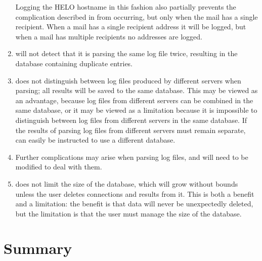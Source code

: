 \begin{enumerate}
        Logging the HELO hostname in this fashion also partially prevents
        the complication described in  from occurring, but only when the mail has a
        single recipient.  When a mail has a single recipient address it
        will be logged, but when a mail has multiple recipients no
        addresses are logged.

    \item \parsername{} will not detect that it is parsing the same log
        file twice, resulting in the database containing duplicate entries.

    \item \parsername{} does not distinguish between log files produced by
        different servers when parsing; all results will be saved to the
        same database.  This may be viewed as an advantage, because log
        files from different servers can be combined in the same database,
        or it may be viewed as a limitation because it is impossible to
        distinguish between log files from different servers in the same
        database.  If the results of parsing log files from different
        servers must remain separate, \parsername{} can easily be
        instructed to use a different database.

    \item Further complications may arise when parsing log files, and
        \parsername{} will need to be modified to deal with them.

    \item \parsername{} does not limit the size of the database, which will
        grow without bounds unless the user deletes connections and results
        from it.  This is both a benefit and a limitation: the benefit is
        that data will never be unexpectedly deleted, but the limitation is
        that the user must manage the size of the database.

\end{enumerate}


\section{Summary}

